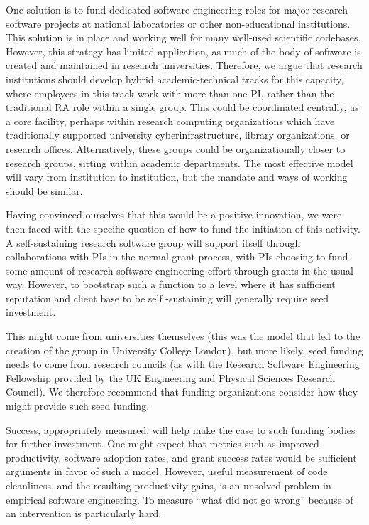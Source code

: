 One solution is to fund dedicated software engineering roles for major research
software projects at national laboratories or other non-educational
institutions. This solution is in place and working well for many well-used
scientific codebases. However, this strategy has limited application, as much of
the body of software is created and maintained in research universities.
Therefore, we argue that research institutions should develop hybrid
academic-technical tracks for this capacity, where employees in this track work
with more than one PI, rather than the traditional RA role within a single
group. This could be coordinated centrally, as a core facility, perhaps within
research computing organizations which have traditionally supported university
cyberinfrastructure, library organizations, or research offices. Alternatively,
these groups could be organizationally closer to research groups, sitting within
academic departments. The most effective model will vary from institution to
institution, but the mandate and ways of working should be similar.

Having convinced ourselves that this would be a positive innovation, we were
then faced with the specific question of how to fund the initiation of this
activity. A self-sustaining research software group will support itself through
collaborations with PIs in the normal grant process, with PIs choosing to fund
some amount of research software engineering effort through grants in the usual
way. However, to bootstrap such a function to a level where it has sufficient
reputation and client base to be self -sustaining will generally require seed
investment.

This might come from universities themselves (this was the model that led to the
creation of the group in University College London), but more likely, seed
funding needs to come from research councils (as with the Research Software
Engineering Fellowship provided by the UK Engineering and Physical Sciences
Research Council). We therefore recommend that funding organizations consider
how they might provide such seed funding.

Success, appropriately measured, will help make the case to such funding bodies
for further investment. One might expect that metrics such as improved
productivity, software adoption rates, and grant success rates would be
sufficient arguments in favor of such a model. However, useful measurement of
code cleanliness, and the resulting productivity gains, is an unsolved problem
in empirical software engineering. To measure ``what did not go wrong'' because
of an intervention is particularly hard.

